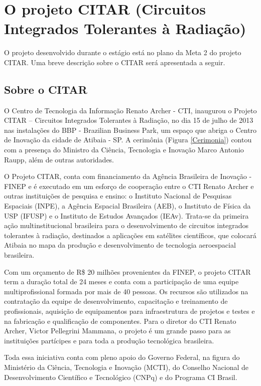 \chapter{O projeto CITAR (Circuitos Integrados Tolerantes à Radiação)}
O projeto desenvolvido durante o estágio está no plano da Meta 2 do projeto CITAR. Uma breve descrição sobre o CITAR será apresentada a seguir.

\section{Sobre o CITAR}
O Centro de Tecnologia da Informação Renato Archer - CTI, inaugurou o Projeto CITAR – Circuitos Integrados Tolerantes à Radiação, no dia 15 de julho de 2013 nas instalações do BBP - Brazilian Business Park, um espaço que abriga o Centro de Inovação da cidade de Atibaia - SP. A cerimônia (Figura \ref{Cerimonia}) contou com a presença do Ministro da Ciência, Tecnologia e Inovação Marco Antonio Raupp, além de outras autoridades.

O Projeto CITAR, conta com financiamento da Agência Brasileira de Inovação - FINEP e é executado em um esforço de cooperação entre o CTI Renato Archer e outras instituições de pesquisa e ensino: o Instituto Nacional de Pesquisas Espaciais (INPE), a Agência Espacial Brasileira (AEB), o Instituto de Física da USP (IFUSP) e o Instituto de Estudos Avançados (IEAv).
Trata-se da primeira ação multinstitucional brasileira para o desenvolvimento de circuitos integrados tolerantes à radiação, destinados a aplicações em satélites científicos, que colocará Atibaia no mapa da produção e desenvolvimento de tecnologia aeroespacial brasileira.

Com um orçamento de R\$ 20 milhões provenientes da FINEP, o projeto CITAR term a duração total de 24 meses e conta com a participação de uma equipe multiprofissional formada por mais de 40 pessoas. Os recursos são utilizados na contratação da equipe de desenvolvimento, capacitação e treinamento de profissionais, aquisição de equipamentos para infraestrutura de projetos e testes e na fabricação e qualificação de componentes. Para o diretor do CTI Renato Archer, Victor Pellegrini Mammana, o projeto é um grande passo para as instituições partícipes e para toda a produção tecnológica brasileira.

Toda essa iniciativa conta com pleno apoio do Governo Federal, na figura do Ministério da Ciência, Tecnologia e Inovação (MCTI), do Conselho Nacional de Desenvolvimento Científico e Tecnológico (CNPq) e do Programa CI Brasil.

